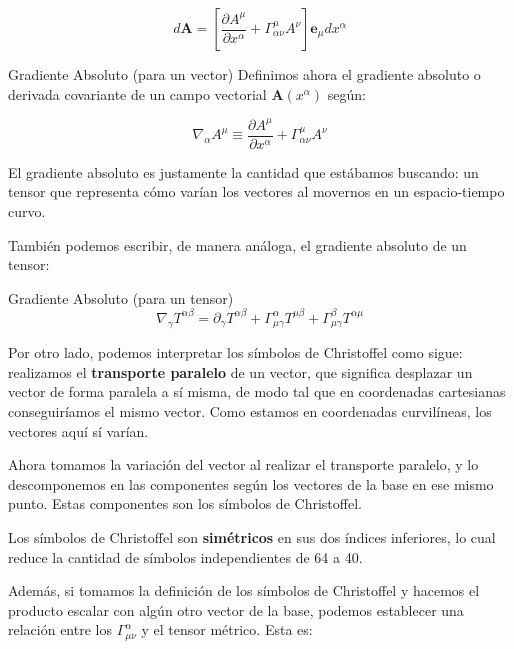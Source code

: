 \begin{equation}
    d\mathbf{A}= \left[\frac{\partial A^{\mu}}{\partial x^\alpha}+\Gamma^\mu_{\alpha \nu}A^{\nu}\right]\mathbf{e}_{\mu}dx^{\alpha}
\end{equation}

\begin{remarkbox}{Gradiente Absoluto (para un vector)}
        Definimos ahora el gradiente absoluto o derivada covariante de un campo vectorial $\mathbf{A}(x^{\alpha})$ según:
        
        \begin{equation}
            \nabla_\alpha A^{\mu}\equiv\frac{\partial A^{\mu}}{\partial x^\alpha}+\Gamma^\mu_{\alpha \nu}A^{\nu}
        \end{equation}
\end{remarkbox}


El gradiente absoluto es justamente la cantidad que estábamos buscando: un tensor que representa cómo varían los vectores al movernos en un espacio-tiempo curvo.

También podemos escribir, de manera análoga, el gradiente absoluto de un tensor:

\begin{remarkbox}{Gradiente Absoluto (para un tensor)}
\begin{equation}
\nabla_\gamma T^{\alpha\beta} = \partial_\gamma T^{\alpha\beta} + \Gamma^\alpha_{\mu\gamma}T^{\mu\beta} + \Gamma^\beta_{\mu\gamma}T^{\alpha\mu}
\end{equation}
\end{remarkbox}

Por otro lado, podemos interpretar los símbolos de Christoffel como sigue: realizamos el \textbf{transporte paralelo} de un vector, que significa desplazar un vector de forma paralela a sí misma, de modo tal que en coordenadas cartesianas conseguiríamos el mismo vector. Como estamos en coordenadas curvilíneas, los vectores aquí sí varían.


Ahora tomamos la variación del vector al realizar el transporte paralelo, y lo descomponemos en las componentes según los vectores de la base en ese mismo punto. Estas componentes son los símbolos de Christoffel.

Los símbolos de Christoffel son \textbf{simétricos} en sus dos índices inferiores, lo cual reduce la cantidad de símbolos independientes de 64 a 40. 

Además, si tomamos la definición de los símbolos de Christoffel y hacemos el producto escalar con algún otro vector de la base, podemos establecer una relación entre los $\Gamma^{\alpha}_{\mu \nu}$ y el tensor métrico. Esta es:

